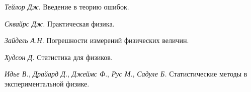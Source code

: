 \documentclass[a5paper,10pt,oneside]{report}
\begin{document}






% 





\begin{thebibliography}{1}

 \textit{Тейлор Дж}. Введение в теорию ошибок.

 \textit{Сквайрс Дж.} Практическая физика.

 \textit{Зайдель А.Н.} Погрешности измерений физических величин.

 \textit{Худсон Д.} Статистика для физиков.

 \textit{Идье В.}, \textit{Драйард Д.}, \textit{Джеймс Ф}., \textit{Рус М.}, \textit{Садуле Б.} Статистические методы в экспериментальной физике.

\end{thebibliography}
\end{document}
